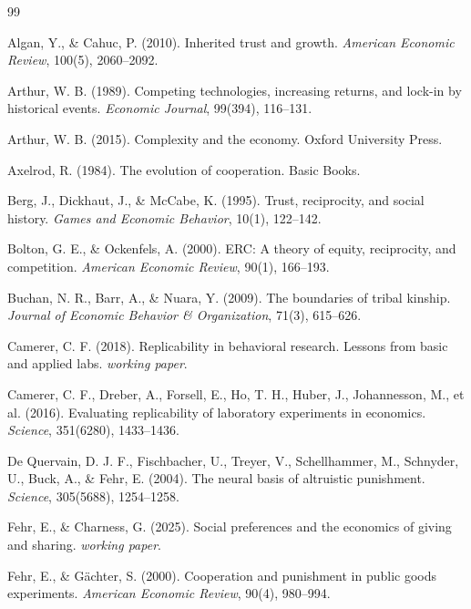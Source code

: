 \documentclass[12pt,oneside]{book}
\begin{document}
\begin{thebibliography}{99}

  Algan, Y., \& Cahuc, P. (2010). Inherited trust and growth.
  \textit{American Economic Review}, 100(5), 2060--2092.

  Arthur, W. B. (1989). Competing technologies, increasing returns, and lock-in by historical events.
  \textit{Economic Journal}, 99(394), 116--131.

  Arthur, W. B. (2015). Complexity and the economy.
  Oxford University Press.

  Axelrod, R. (1984). The evolution of cooperation.
  Basic Books.

  Berg, J., Dickhaut, J., \& McCabe, K. (1995). Trust, reciprocity, and social history.
  \textit{Games and Economic Behavior}, 10(1), 122--142.

  Bolton, G. E., \& Ockenfels, A. (2000). ERC: A theory of equity, reciprocity, and competition.
  \textit{American Economic Review}, 90(1), 166--193.

  Buchan, N. R., Barr, A., \& Nuara, Y. (2009). The boundaries of tribal kinship.
  \textit{Journal of Economic Behavior \& Organization}, 71(3), 615--626.

  Camerer, C. F. (2018). Replicability in behavioral research. Lessons from basic and applied labs.
  \textit{working paper}.

  Camerer, C. F., Dreber, A., Forsell, E., Ho, T. H., Huber, J., Johannesson, M., et al. (2016).
  Evaluating replicability of laboratory experiments in economics.
  \textit{Science}, 351(6280), 1433--1436.

  De Quervain, D. J. F., Fischbacher, U., Treyer, V., Schellhammer, M., Schnyder, U., Buck, A., \&
  Fehr, E. (2004). The neural basis of altruistic punishment.
  \textit{Science}, 305(5688), 1254--1258.

  Fehr, E., \& Charness, G. (2025). Social preferences and the economics of giving and sharing.
  \textit{working paper}.

  Fehr, E., \& Gächter, S. (2000). Cooperation and punishment in public goods experiments.
  \textit{American Economic Review}, 90(4), 980--994.


\end{thebibliography}
\end{document}
